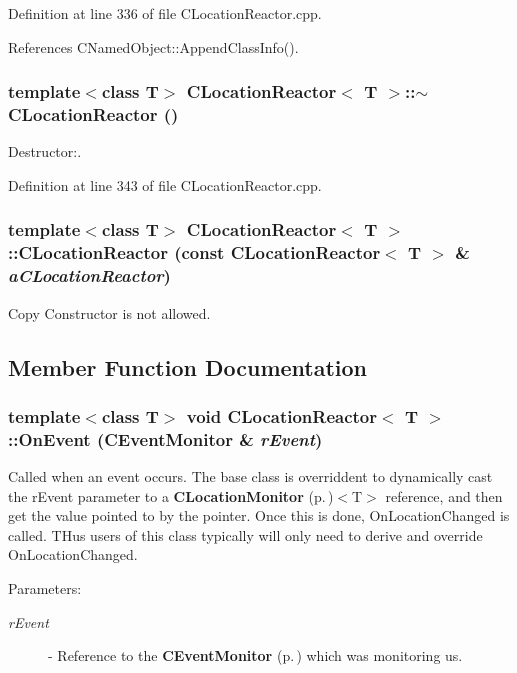 Definition at line 336 of file CLocation\-Reactor.cpp.

References CNamed\-Object::Append\-Class\-Info().
\subsubsection{\setlength{\rightskip}{0pt plus 5cm}template$<$class T$>$ CLocation\-Reactor$<$ T $>$::$\sim$CLocation\-Reactor ()}\label{classCLocationReactor_a3}


Destructor:.



Definition at line 343 of file CLocation\-Reactor.cpp.
\subsubsection{\setlength{\rightskip}{0pt plus 5cm}template$<$class T$>$ CLocation\-Reactor$<$ T $>$::CLocation\-Reactor (const CLocation\-Reactor$<$ T $>$ \& {\em a\-CLocation\-Reactor})\hspace{0.3cm}{\tt  [private]}}\label{classCLocationReactor_c0}


Copy Constructor is not allowed.



\subsection{Member Function Documentation}
\subsubsection{\setlength{\rightskip}{0pt plus 5cm}template$<$class T$>$ void CLocation\-Reactor$<$ T $>$::On\-Event ({\bf CEvent\-Monitor} \& {\em r\-Event})\hspace{0.3cm}{\tt  [virtual]}}\label{classCLocationReactor_a5}


Called when an event occurs.  The base class is overriddent to dynamically cast the  r\-Event parameter to a {\bf CLocation\-Monitor} {\rm (p.\,\pageref{classCLocationMonitor})}$<$T$>$ reference, and then get the value pointed to by the pointer. Once this is done, On\-Location\-Changed is called. THus users of this class typically will only need to derive and override On\-Location\-Changed.\begin{Desc}
\item[Parameters: ]\par
\begin{description}
\item[{\em 
r\-Event}]- Reference to the {\bf CEvent\-Monitor} {\rm (p.\,\pageref{classCEventMonitor})} which was monitoring us. \end{description}
\end{Desc}


